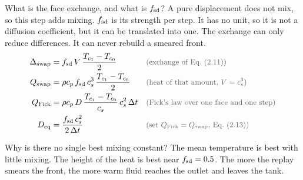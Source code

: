 \begin{qabox}{What is the face exchange, and what is $f_{\mathrm{sd}}$?}
\explain A pure displacement does not mix, so this step adds mixing. $f_{\mathrm{sd}}$ is its strength per
step. It has no unit, so it is not a diffusion coefficient, but it can be translated into one. The
exchange can only reduce differences. It can never rebuild a smeared front.
\derive
\begin{align*}
\Delta_{\mathrm{swap}} &= \fsd\,V\,\frac{T_{c_1}-T_{c_0}}{2} \why{exchange of Eq.~(2.11)} \\
Q_{\mathrm{swap}} &= \rho c_p\,\fsd\,c_s^{3}\,\frac{T_{c_1}-T_{c_0}}{2} \why{heat of that amount, $V = c_s^3$} \\
Q_{\mathrm{Fick}} &= \rho c_p\,D\,\frac{T_{c_1}-T_{c_0}}{c_s}\,c_s^{2}\,\Delta t \why{Fick's law over one face and one step} \\
D_{\mathrm{eq}} &= \frac{\fsd\,c_s^{2}}{2\,\Delta t} \why{set $Q_{\mathrm{Fick}} = Q_{\mathrm{swap}}$, Eq.~(2.13)}
\end{align*}
\end{qabox}

\begin{qabox}{Why is there no single best mixing constant?}
\explain The mean temperature is best with little mixing. The height of the heat is best near
$f_{\mathrm{sd}} = 0.5$. The more the replay smears the front, the more warm fluid reaches the outlet and
leaves the tank.
\end{qabox}

